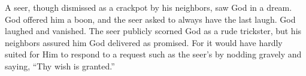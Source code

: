 A seer, though dismissed as a crackpot by his neighbors, saw God in a
dream. God offered him a boon, and the seer asked to always have the
last laugh. God laughed and vanished. The seer publicly scorned God as a
rude trickster, but his neighbors assured him God delivered as promised.
For it would have hardly suited for Him to respond to a request such as
the seer's by nodding gravely and saying, ``Thy wish is granted.''
